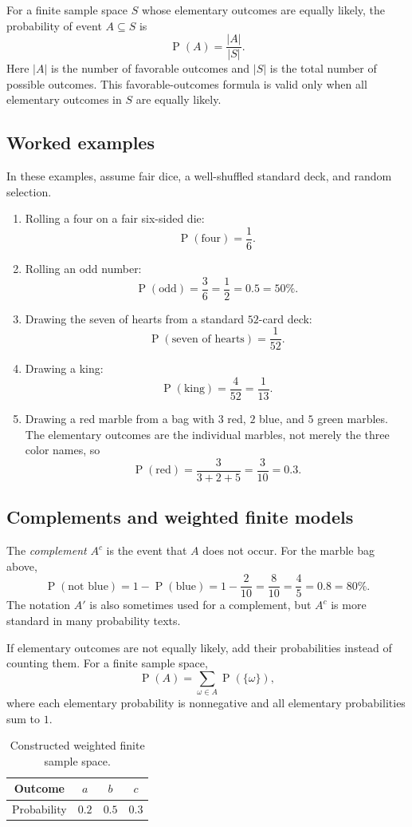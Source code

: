 \documentclass[11pt]{article}
\newcommand{\Pp}{\operatorname{P}}
\begin{document}
For a finite sample space $S$ whose elementary outcomes are equally likely, the
probability of event $A\subseteq S$ is
\[
\Pp(A)=\frac{|A|}{|S|}.
\]
Here $|A|$ is the number of favorable outcomes and $|S|$ is the total number of
possible outcomes.  This favorable-outcomes formula is valid only when all
elementary outcomes in $S$ are equally likely.

\subsection{Worked examples}
In these examples, assume fair dice, a well-shuffled standard deck, and random
selection.
\begin{enumerate}[label=\textbf{\arabic*.}]
\item Rolling a four on a fair six-sided die:
\[
\Pp(\text{four})=\frac{1}{6}.
\]
\item Rolling an odd number:
\[
\Pp(\text{odd})=\frac{3}{6}=\frac{1}{2}=0.5=50\%.
\]
\item Drawing the seven of hearts from a standard $52$-card deck:
\[
\Pp(\text{seven of hearts})=\frac{1}{52}.
\]
\item Drawing a king:
\[
\Pp(\text{king})=\frac{4}{52}=\frac{1}{13}.
\]
\item Drawing a red marble from a bag with $3$ red, $2$ blue, and $5$ green
marbles.  The elementary outcomes are the individual marbles, not merely the
three color names, so
\[
\Pp(\text{red})=\frac{3}{3+2+5}=\frac{3}{10}=0.3.
\]
\end{enumerate}

\subsection{Complements and weighted finite models}
The \emph{complement} $A^c$ is the event that $A$ does not occur.  For the
marble bag above,
\[
\Pp(\text{not blue})=1-\Pp(\text{blue})
=1-\frac{2}{10}=\frac{8}{10}=\frac{4}{5}=0.8=80\%.
\]
The notation $A'$ is also sometimes used for a complement, but $A^c$ is more
standard in many probability texts.

If elementary outcomes are not equally likely, add their probabilities instead
of counting them.  For a finite sample space,
\[
\Pp(A)=\sum_{\omega\in A}\Pp(\{\omega\}),
\]
where each elementary probability is nonnegative and all elementary probabilities
sum to $1$.

\begin{table}[ht]
\centering
\caption{Constructed weighted finite sample space.}\label{tab:weighted}
\begin{tabular}{@{}cccc@{}}
\toprule
Outcome & $a$ & $b$ & $c$ \\
\midrule
Probability & $0.2$ & $0.5$ & $0.3$ \\
\bottomrule
\end{tabular}
\end{table}
\end{document}
